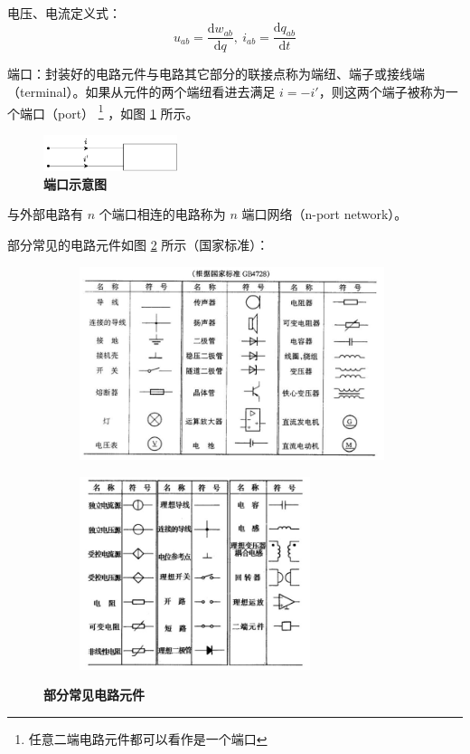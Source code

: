 \documentclass[UTF8]{report}
\theoremstyle{MyLineTheoremStyle} %
\theoremstyle{MyBlockTheoremStyle} %
\theoremstyle{MySubsubsectionStyle} %
\begin{document}
电压、电流定义式：
\begin{equation}
u_{ab} = \frac{\mathrm{d} w_{ab}}{\mathrm{d}q},\ i_{ab} = \frac{\mathrm{d} q_{ab}}{\mathrm{d}t}
\end{equation}



端口：封装好的电路元件与电路其它部分的联接点称为端纽、端子或接线端（terminal）。如果从元件的两个端纽看进去满足 $i = -i'$，则这两个端子被称为一个端口（port）
\footnote{任意二端电路元件都可以看作是一个端口}
，如图 \ref{端口示意图} 所示。

\begin{figure}[H]\centering
\includegraphics[width=0.35\textwidth]{assets/1,2/端口.drawio.pdf}
\caption{\textbf{端口示意图}}\label{端口示意图}
\end{figure}

与外部电路有 $n$ 个端口相连的电路称为 $n$ 端口网络（n-port network）。

部分常见的电路元件如图 \ref{部分常见电路元件} 所示（国家标准）：

\begin{figure}[H]\centering
\begin{subfigure}[t]{0.52\textwidth}\centering
    \includegraphics[height=160pt]{assets/1,2/7d3f6db847882c6447cc046186ede6ef.jpg}
\end{subfigure}\begin{subfigure}[t]{0.47\textwidth}\centering
    \includegraphics[height=160pt]{assets/1,2/3f5d73ec5ae9909ab42cd864852b0d72.jpg}
\end{subfigure}
\caption{\bfseries \textbf{部分常见电路元件} }\label{部分常见电路元件}
\end{figure}
\end{document}
